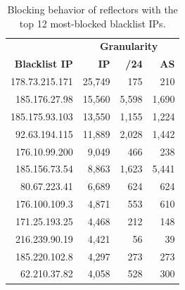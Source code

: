 \begin{table}[t]
\centering
\caption{Blocking behavior of reflectors with the top 12 most-blocked
  blacklist IPs.}
\begin{tabular}{r  r  r  r}
 \toprule
                         & \multicolumn{3}{c}{\textbf{Granularity}} \\
 \textbf{Blacklist IP}   & \textbf{IP}  & \textbf{/24}   & \textbf{AS}\\
 \midrule
 178.73.215.171             & 25,749                 & 175        & 210     \\
 185.176.27.98              & 15,560                 & 5,598      & 1,690   \\
 185.175.93.103             & 13,550                 & 1,155      & 1,224   \\
 92.63.194.115              & 11,889                 & 2,028      & 1,442   \\
 176.10.99.200              & 9,049                  & 466        & 238     \\
 185.156.73.54              & 8,863                  & 1,623      & 5,441   \\
 80.67.223.41               & 6,689                  & 624       & 624      \\
 176.100.109.3              & 4,871                  & 553       & 610      \\
 171.25.193.25              & 4,468                  & 212       & 148      \\
 216.239.90.19              & 4,421                  & 56        & 39       \\
 185.220.102.8              & 4,297                  & 273       & 273      \\
 62.210.37.82               & 4,058                  & 528       & 300      \\
 \bottomrule
\end{tabular}

\label{tab:super-malicious-ips}
\end{table}


